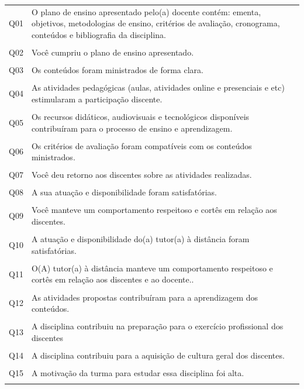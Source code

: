 \documentclass[a4paper,10pt]{article}
\begin{document}
\small{
\begin{center}
\begin{tabularx}{\linewidth}{c|X}
Q01&O plano de ensino apresentado pelo(a) docente contém: ementa, objetivos, metodologias de ensino, critérios de avaliação, cronograma, conteúdos e bibliografia da disciplina.\\\\
Q02&Você cumpriu o plano de ensino apresentado.\\\\
Q03&Os conteúdos foram ministrados de forma clara.\\\\
Q04&As atividades pedagógicas (aulas, atividades online e presenciais e etc) estimularam a participação discente.\\\\
Q05&Os recursos didáticos, audiovisuais e tecnológicos disponíveis contribuíram para o processo de ensino e aprendizagem.\\\\
Q06&Os critérios de avaliação foram compatíveis com os conteúdos ministrados.\\\\
Q07&Você deu retorno aos discentes sobre as atividades realizadas.\\\\
Q08&A sua atuação e disponibilidade foram satisfatórias.\\\\
Q09&Você manteve um comportamento respeitoso e cortês em relação aos discentes.\\\\
Q10&A atuação e disponibilidade do(a) tutor(a) à distância foram satisfatórias.\\\\
Q11&O(A) tutor(a) à distância manteve um comportamento respeitoso e cortês em relação aos discentes e ao docente..\\\\
Q12&As atividades propostas contribuíram para a aprendizagem dos conteúdos.\\\\
Q13&A disciplina contribuiu na preparação para o exercício profissional dos discentes\\\\
Q14&A disciplina contribuiu para a aquisição de cultura geral dos discentes.\\\\
Q15&A motivação da turma para estudar essa disciplina foi alta.\\\\

\end{tabularx}
\end{center}}
\end{document}
